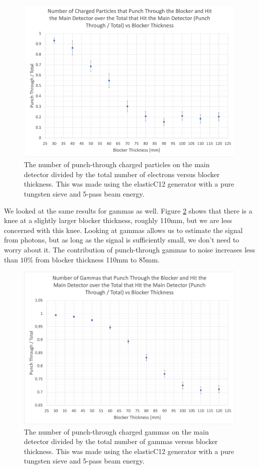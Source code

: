 \begin{figure}[H]
    \centering
    \includegraphics[scale=0.4]{Images/ChargedParticlesPunchThroughOverTotal_Blocker_10062021.png}
    \caption{The number of punch-through charged particles on the main detector divided by the total number of electrons versus blocker thickness. This was made using the elasticC12 generator with a pure tungsten sieve and 5-pass beam energy.}
    \label{fig:blocker_CP_main_ratio}
\end{figure}

We looked at the same results for gammas as well. Figure \ref{fig:blocker_main_gammas} shows that there is a knee at a slightly larger blocker thickness, roughly 110mm, but we are less concerned with this knee. Looking at gammas allows us to estimate the signal from photons, but as long as the signal is sufficiently small, we don't need to worry about it. The contribution of punch-through gammas to noise increases less than $10\%$ from blocker thickness 110mm to 85mm.

\begin{figure}[H]
    \centering
    \includegraphics[scale=0.5]{Images/GammasPunchThroughOverTotal_Blocker_10202021.png}
    \caption{The number of punch-through charged gammas on the main detector divided by the total number of gammas versus blocker thickness. This was made using the elasticC12 generator with a pure tungsten sieve and 5-pass beam energy.}
    \label{fig:blocker_main_gammas}
\end{figure}

